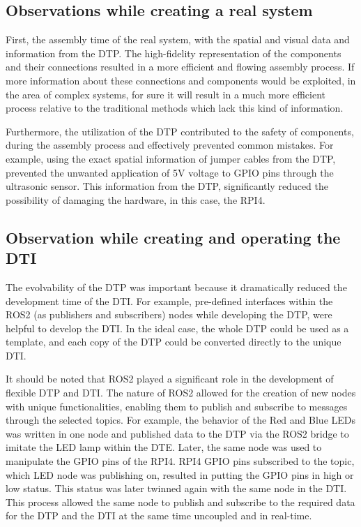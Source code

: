 \documentclass[conference]{IEEEtran}
\begin{document}
    \subsection{Observations while creating a real system}

    First, the assembly time of the real system, with the spatial and visual data and information from the DTP. The high-fidelity representation of the components and their connections resulted in a more efficient and flowing assembly process.  If more information about these connections and components would be exploited, in the area of complex systems,  for sure it will result in a much more efficient process relative to the traditional methods which lack this kind of information. 

    Furthermore, the utilization of the DTP contributed to the safety of components, during the assembly process and effectively prevented common mistakes. For example, using the exact spatial information of jumper cables from the DTP, prevented the unwanted application of 5V  voltage to GPIO pins through the ultrasonic sensor. This information from the DTP, significantly reduced the possibility of damaging the hardware, in this case, the RPI4. 

    \subsection{Observation while creating and operating the DTI}

    The evolvability of the DTP was important because it dramatically reduced the development time of the DTI. For example, pre-defined interfaces within the ROS2 (as publishers and subscribers) nodes while developing the DTP, 
    were helpful to develop the DTI. In the ideal case, the whole DTP could be used as a template, and each copy of the DTP could be converted directly to the unique DTI.

    It should be noted that ROS2 played a significant role in the development of flexible DTP and DTI. The nature of  ROS2 allowed for the creation of new nodes with unique functionalities, 
    enabling them to publish and subscribe to messages through the selected topics. For example, the behavior of the Red and Blue LEDs was written in one node and published data to the DTP via 
    the ROS2 bridge to imitate the LED lamp within the DTE. Later, the same node was used to manipulate the GPIO pins of the RPI4. RPI4 GPIO pins subscribed to the topic, which 
    LED node was publishing on, resulted in putting the GPIO pins in high or low status. This status was later twinned again with the same node in the DTI. 
    This process allowed the same node to publish and subscribe to the required data for the DTP and the DTI at the same time uncoupled and in real-time. 
\end{document}
